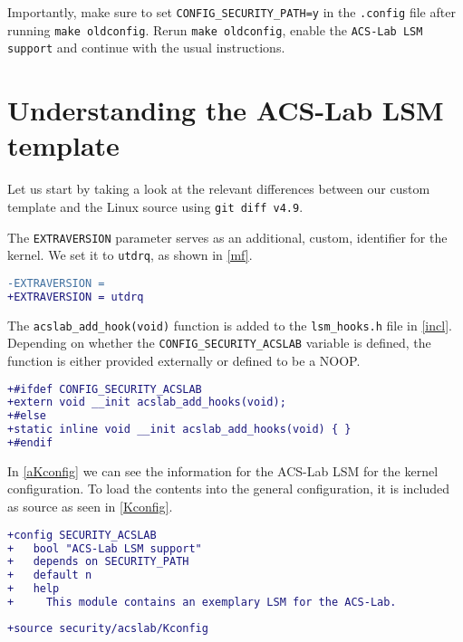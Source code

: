 \documentclass{semdoc}
\begin{document}
Importantly, make sure to set \texttt{CONFIG\_SECURITY\_PATH=y} in the \texttt{.config} file after running \texttt{make oldconfig}. Rerun \texttt{make oldconfig}, enable the \texttt{ACS-Lab LSM support} and continue with the usual instructions.

\section{Understanding the ACS-Lab LSM template}
Let us start by taking a look at the relevant differences between our custom template and the Linux source using \texttt{git diff v4.9}.

The \texttt{EXTRAVERSION} parameter serves as an additional, custom, identifier for the kernel.
We set it to \texttt{utdrq}, as shown in \cref{mf}.

\begin{lstlisting}[language=diff, label={mf}, caption={Changes in \texttt{Makefile}}]
-EXTRAVERSION =
+EXTRAVERSION = utdrq
\end{lstlisting}

The \texttt{acslab\_add\_hook(void)} function is added to the \texttt{lsm\_hooks.h} file in \cref{incl}. 
Depending on whether the \texttt{CONFIG\_SECURITY\_ACSLAB} variable is defined, the function is either provided externally or defined to be a NOOP.

\begin{lstlisting}[language=diff, label={incl}, caption={Changes in \texttt{include/linux/lsm\_hooks.h}}]
+#ifdef CONFIG_SECURITY_ACSLAB
+extern void __init acslab_add_hooks(void);
+#else
+static inline void __init acslab_add_hooks(void) { }
+#endif
\end{lstlisting}

In \cref{aKconfig} we can see the information for the ACS-Lab LSM for the kernel configuration.
To load the contents into the general configuration, it is included as source as seen in \cref{Kconfig}.

\begin{lstlisting}[language=diff, label={aKconfig}, caption={New file \texttt{security/acslab/Kconfig}}]
+config SECURITY_ACSLAB
+	bool "ACS-Lab LSM support"
+	depends on SECURITY_PATH
+	default n
+	help
+	  This module contains an exemplary LSM for the ACS-Lab.
\end{lstlisting}

\begin{lstlisting}[language=diff, label={Kconfig}, caption={Changes in \texttt{security/Kconfig}}]
+source security/acslab/Kconfig
\end{lstlisting}
\end{document}
